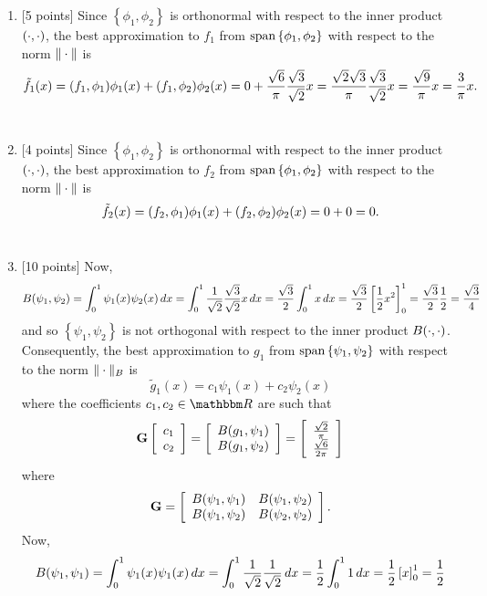 \begin{solution}
\begin{enumerate}
\item {[5 points]} Since $\left\{\phi_1,\phi_2\right\}$ is orthonormal with respect to the inner product $(\cdot,\cdot)$, the best approximation to $f_1$ from ${\rm span}\left\{\phi_1,\phi_2\right\}$ with respect to the norm $\|\cdot\|$ is
\[
\tilde{f}_1(x)=(f_1,\phi_1)\phi_1(x)+(f_1,\phi_2)\phi_2(x)=0+{\sqrt{6}\over\pi}{\sqrt{3}\over\sqrt{2}}x={\sqrt{2}\sqrt{3}\over\pi}{\sqrt{3}\over\sqrt{2}}x={\sqrt{9}\over\pi}x={3\over\pi}x.
\]
\\
\item {[4 points]} Since $\left\{\phi_1,\phi_2\right\}$ is orthonormal with respect to the inner product $(\cdot,\cdot)$, the best approximation to $f_2$ from ${\rm span}\left\{\phi_1,\phi_2\right\}$ with respect to the norm $\|\cdot\|$ is
\[
\tilde{f}_2(x)=(f_2,\phi_1)\phi_1(x)+(f_2,\phi_2)\phi_2(x)=0+0=0.
\]
\\
\item {[10 points]} Now,
\[
B(\psi_1,\psi_2)=\int_0^1\psi_1(x)\psi_2(x)\,dx=\int_0^1{1\over\sqrt{2}}{\sqrt{3}\over\sqrt{2}}x\,dx={\sqrt{3}\over 2}\int_0^1x\,dx={\sqrt{3}\over 2}\left[{1\over 2}x^2\right]_0^1={\sqrt{3}\over 2}{1\over 2}={\sqrt{3}\over 4}
\]
and so $\left\{\psi_1,\psi_2\right\}$ is not orthogonal with respect to the inner product $B(\cdot,\cdot)$. Consequently, the best approximation to $g_1$ from ${\rm span}\left\{\psi_1,\psi_2\right\}$ with respect to the norm $\|\cdot\|_B$ is
\[
\tilde{g}_1(x)=c_1\psi_1(x)+c_2\psi_2(x)
\]
where the coefficients $c_1,c_2\in\R$ are such that
\[
{\bf G}\left[\begin{array}{c}c_1 \\ c_2\end{array}\right]=\left[\begin{array}{c}B(g_1,\psi_1) \\ B(g_1,\psi_2)\end{array}\right]=\left[\begin{array}{c}{\sqrt{2}\over\pi} \\ {\sqrt{6}\over 2\pi}\end{array}\right]
\]
where
\[
{\bf G}=\left[\begin{array}{cc} B(\psi_1,\psi_1) & B(\psi_1,\psi_2) \\ B(\psi_1,\psi_2) & B(\psi_2,\psi_2)\end{array}\right].
\]
Now,
\[
B(\psi_1,\psi_1)=\int_0^1\psi_1(x)\psi_1(x)\,dx=\int_0^1{1\over\sqrt{2}}{1\over\sqrt{2}}\,dx={1\over 2}\int_0^11\,dx={1\over 2}\left[x\right]_0^1={1\over 2}
\]
\end{enumerate}
\end{solution}
